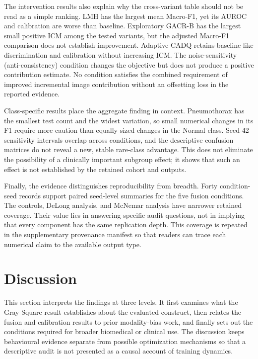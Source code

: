 \documentclass[10pt,a4paper,twocolumn]{article}
\begin{document}
The intervention results also explain why the cross-variant table should not be
read as a simple ranking. LMH has the largest mean Macro-F1, yet its AUROC and
calibration are worse than baseline. Exploratory GACR-B has the largest small
positive ICM among the tested variants, but the adjusted Macro-F1 comparison
does not establish improvement. Adaptive-CADQ retains baseline-like
discrimination and calibration without increasing ICM. The
noise-sensitivity (anti-consistency) condition changes the objective but does
not produce a positive contribution estimate. No condition satisfies the
combined requirement of improved incremental image contribution without an
offsetting loss in the reported evidence.

Class-specific results place the aggregate finding in context. Pneumothorax has
the smallest test count and the widest variation, so small numerical changes in
its F1 require more caution than equally sized changes in the Normal class.
Seed-42 sensitivity intervals overlap across conditions, and the descriptive
confusion matrices do not reveal a new, stable rare-class advantage. This does
not eliminate the possibility of a clinically important subgroup effect; it
shows that such an effect is not established by the retained cohort and
outputs.

Finally, the evidence distinguishes reproducibility from breadth. Forty
condition-seed records support paired seed-level summaries for the five fusion
conditions. The controls, DeLong analysis, and McNemar analysis have narrower
retained coverage. Their value lies in answering specific audit questions, not
in implying that every component has the same replication depth. This coverage
is repeated in the supplementary provenance manifest so that readers can trace
each numerical claim to the available output type.

\FloatBarrier
\section{Discussion}\label{sec:discussion}

This section interprets the findings at three levels. It first examines what
the Gray-Square result establishes about the evaluated construct, then relates
the fusion and calibration results to prior modality-bias work, and finally
sets out the conditions required for broader biomedical or clinical use. The
discussion keeps behavioural evidence separate from possible optimization
mechanisms so that a descriptive audit is not presented as a causal account of
training dynamics.
\end{document}
